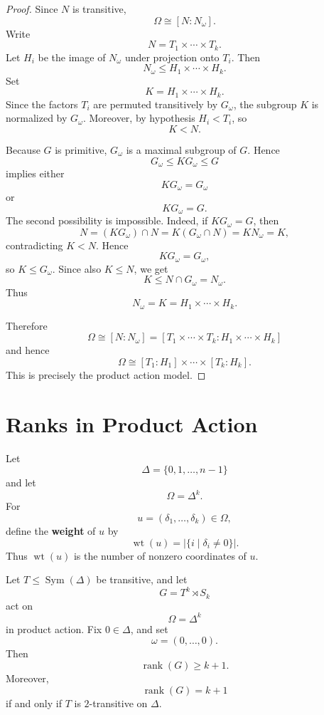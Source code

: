 \begin{proof}
Since \(N\) is transitive,
\[
\Omega \cong [N:N_\omega].
\]
Write
\[
N=T_1\times \cdots \times T_k.
\]
Let \(H_i\) be the image of \(N_\omega\) under projection onto \(T_i\). Then
\[
N_\omega \leq H_1\times \cdots \times H_k.
\]
Set
\[
K=H_1\times \cdots \times H_k.
\]
Since the factors \(T_i\) are permuted transitively by \(G_\omega\), the subgroup
\(K\) is normalized by \(G_\omega\). Moreover, by hypothesis \(H_i<T_i\), so
\[
K<N.
\]

Because \(G\) is primitive, \(G_\omega\) is a maximal subgroup of \(G\). Hence
\[
G_\omega \leq KG_\omega \leq G
\]
implies either
\[
KG_\omega=G_\omega
\]
or
\[
KG_\omega=G.
\]
The second possibility is impossible. Indeed, if \(KG_\omega=G\), then
\[
N=(KG_\omega)\cap N
=
K(G_\omega\cap N)
=
KN_\omega
=
K,
\]
contradicting \(K<N\). Hence
\[
KG_\omega=G_\omega,
\]
so \(K\leq G_\omega\). Since also \(K\leq N\), we get
\[
K\leq N\cap G_\omega=N_\omega.
\]
Thus
\[
N_\omega=K=H_1\times \cdots \times H_k.
\]

Therefore
\[
\Omega
\cong
[N:N_\omega]
=
[T_1\times \cdots \times T_k : H_1\times \cdots \times H_k]
\]
and hence
\[
\Omega
\cong
[T_1:H_1]\times \cdots \times [T_k:H_k].
\]
This is precisely the product action model.
\end{proof}

\section{Ranks in Product Action}

\begin{definition}[Weight]
Let
\[
\Delta=\{0,1,\ldots,n-1\}
\]
and let
\[
\Omega=\Delta^k.
\]
For
\[
u=(\delta_1,\ldots,\delta_k)\in \Omega,
\]
define the \textbf{weight} of \(u\) by
\[
\operatorname{wt}(u)
=
|\{i\mid \delta_i\neq 0\}|.
\]
Thus \(\operatorname{wt}(u)\) is the number of nonzero coordinates of \(u\).
\end{definition}

\begin{lemma}
Let \(T\leq \operatorname{Sym}(\Delta)\) be transitive, and let
\[
G=T^k\rtimes S_k
\]
act on
\[
\Omega=\Delta^k
\]
in product action. Fix \(0\in \Delta\), and set
\[
\omega=(0,\ldots,0).
\]
Then
\[
\operatorname{rank}(G)\geq k+1.
\]
Moreover,
\[
\operatorname{rank}(G)=k+1
\]
if and only if \(T\) is \(2\)-transitive on \(\Delta\).
\end{lemma}

